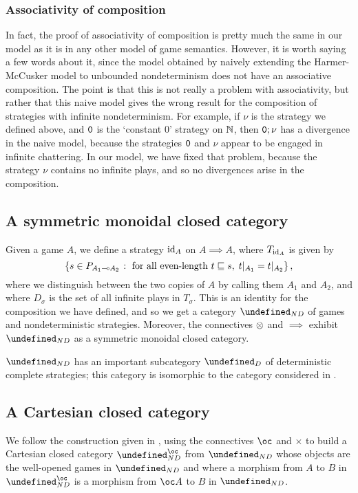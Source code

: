 \documentclass[sigplan,10pt,review]{acmart}\settopmatter{printfolios=true,printccs=false,printacmref=false}
\let\G\undefined
\begin{document}
\subsubsection{Associativity of composition}

In fact, the proof of associativity of composition is pretty much the same in our model as it is in any other model of game semantics.  
However, it is worth saying a few words about it, since the model obtained by naively extending the Harmer-McCusker model to unbounded nondeterminism does not have an associative composition.  
The point is that this is not really a problem with associativity, but rather that this naive model gives the wrong result for the composition of strategies with infinite nondeterminism.
For example, if $\nu$ is the strategy we defined above, and ${\mathtt{0}}$ is the `constant $0$' strategy on $\mathbb{N}$, then ${\mathtt{0}};\nu$ has a divergence in the naive model, because the strategies ${\mathtt{0}}$ and $\nu$ appear to be engaged in infinite chattering.  
In our model, we have fixed that problem, because the strategy $\nu$ contains no infinite plays, and so no divergences arise in the composition.

\subsection{A symmetric monoidal closed category}

Given a game $A$, we define a strategy $\operatorname{id}_A$ on $A\implies A$, where $T_{\operatorname{id}_A}$ is given by
\[
  \{s\in P_{A_1\multimap A_2}\;\colon\;\textrm{for all even-length }t\sqsubseteq s,\;t\vert_{A_1}=t\vert_{A_2}\}\,,
  \]
where we distinguish between the two copies of $A$ by calling them $A_1$ and $A_2$, and where $D_\sigma$ is the set of all infinite plays in $T_\sigma$.
This is an identity for the composition we have defined, and so we get a category $\G_{ND}$ of games and nondeterministic strategies.
Moreover, the connectives $\otimes$ and $\implies$ exhibit $\G_{ND}$ as a symmetric monoidal closed category.  

$\G_{ND}$ has an important subcategory $\G_D$ of deterministic complete strategies; this category is isomorphic to the category considered in \cite{SamsonGuyIAPassive}.

\subsection{A Cartesian closed category}

We follow the construction given in \cite{SamsonGuyIAPassive}, using the connectives $\oc$ and $\times$ to build a Cartesian closed category $\G_{ND}^\oc$ from $\G_{ND}$ whose objects are the well-opened games in $\G_{ND}$ and where a morphism from $A$ to $B$ in $\G_{ND}^\oc$ is a morphism from $\oc A$ to $B$ in $\G_{ND}$.  
\end{document}
